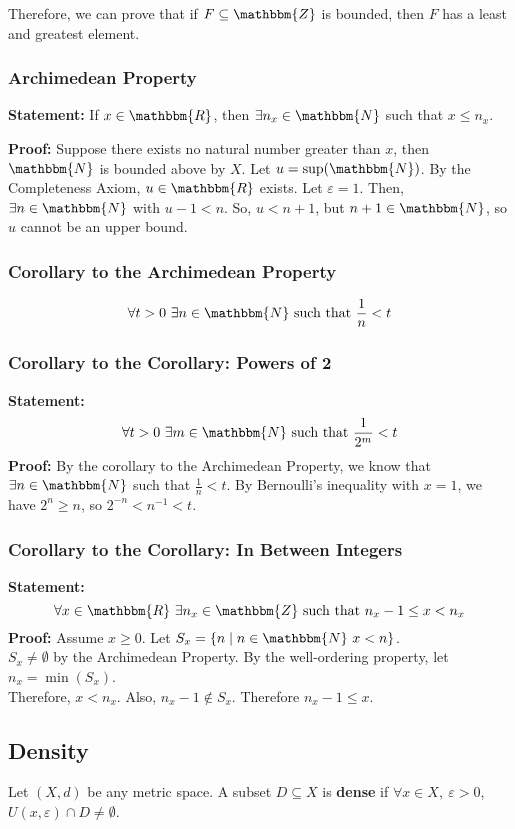 \documentclass[10pt]{extarticle}
\newcommand{\N}{\mathbbm{N}}
\newcommand{\Z}{\mathbbm{Z}}
\newcommand{\R}{\mathbbm{R}}
\begin{document}
    Therefore, we can prove that if $F\subseteq \Z$ is bounded, then $F$ has a least and greatest element.\\
    \subsubsection{Archimedean Property}%
    \textbf{Statement:} If $x\in\R$, then $\exists n_x\in\N$ such that $x\leq n_x$.

    \textbf{Proof:} Suppose there exists no natural number greater than $x$, then $\N$ is bounded above by $X$. Let $u = \sup(\N)$. By the Completeness Axiom, $u\in\R$ exists. Let $\varepsilon = 1$. Then, $\exists n\in\N$ with $u-1 < n$. So, $u < n+1$, but $n+1\in\N$, so $u$ cannot be an upper bound.
    \subsubsection{Corollary to the Archimedean Property}%
      \[
        \forall t > 0~\exists n\in\N \text{ such that } \frac{1}{n}<t
      \] 
    \subsubsection{Corollary to the Corollary: Powers of 2}%
    \textbf{Statement:}
      \[
        \forall t > 0~\exists m\in\N \text{ such that } \frac{1}{2^m} < t
      \] 
    \textbf{Proof:} By the corollary to the Archimedean Property, we know that $\exists n\in \N$ such that $\frac{1}{n} < t$. By Bernoulli's inequality with $x = 1$, we have $2^n \geq n$, so $2^{-n} < n^{-1} < t$.
    \subsubsection{Corollary to the Corollary: In Between Integers}%
    \textbf{Statement:}\[
        \forall x\in\R~\exists n_x\in \Z \text{ such that } n_x-1 \leq x < n_x
      \] 
    \textbf{Proof:} Assume $x \geq 0$. Let $S_x = \{n\mid n\in \N~x < n\}$.\\

      $S_x \neq \emptyset$ by the Archimedean Property. By the well-ordering property, let $n_x = \min(S_x)$.\\

      Therefore, $x < n_x$. Also, $n_x - 1 \notin S_x$. Therefore $n_x - 1 \leq x$.
  \subsection{Density}%
    Let $(X,d)$ be any metric space. A subset $D\subseteq X$ is \textbf{dense} if $\forall x\in X,~ \varepsilon > 0$, $U(x,\varepsilon) \cap D \neq \emptyset$.\\
\end{document}
